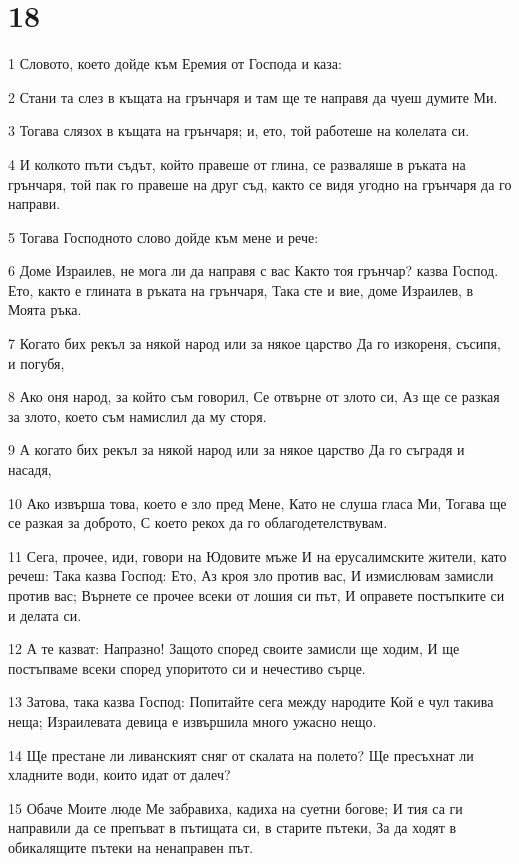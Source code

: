 \chapter{18}

\par 1 Словото, което дойде към Еремия от Господа и каза:
\par 2 Стани та слез в къщата на грънчаря и там ще те направя да чуеш думите Ми.
\par 3 Тогава слязох в къщата на грънчаря; и, ето, той работеше на колелата си.
\par 4 И колкото пъти съдът, който правеше от глина, се разваляше в ръката на грънчаря, той пак го правеше на друг съд, както се видя угодно на грънчаря да го направи.
\par 5 Тогава Господното слово дойде към мене и рече:
\par 6 Доме Израилев, не мога ли да направя с вас Както тоя грънчар? казва Господ. Ето, както е глината в ръката на грънчаря, Така сте и вие, доме Израилев, в Моята ръка.
\par 7 Когато бих рекъл за някой народ или за някое царство Да го изкореня, съсипя, и погубя,
\par 8 Ако оня народ, за който съм говорил, Се отвърне от злото си, Аз ще се разкая за злото, което съм намислил да му сторя.
\par 9 А когато бих рекъл за някой народ или за някое царство Да го съградя и насадя,
\par 10 Ако извърша това, което е зло пред Мене, Като не слуша гласа Ми, Тогава ще се разкая за доброто, С което рекох да го облагодетелствувам.
\par 11 Сега, прочее, иди, говори на Юдовите мъже И на ерусалимските жители, като речеш: Така казва Господ: Ето, Аз кроя зло против вас, И измислювам замисли против вас; Върнете се прочее всеки от лошия си път, И оправете постъпките си и делата си.
\par 12 А те казват: Напразно! Защото според своите замисли ще ходим, И ще постъпваме всеки според упоритото си и нечестиво сърце.
\par 13 Затова, така казва Господ: Попитайте сега между народите Кой е чул такива неща; Израилевата девица е извършила много ужасно нещо.
\par 14 Ще престане ли ливанският сняг от скалата на полето? Ще пресъхнат ли хладните води, които идат от далеч?
\par 15 Обаче Моите люде Ме забравиха, кадиха на суетни богове; И тия са ги направили да се препъват в пътищата си, в старите пътеки, За да ходят в обикалящите пътеки на ненаправен път.

